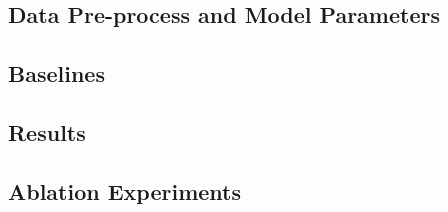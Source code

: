 \begin{Abstract}
\subsection{Data Pre-process and Model Parameters}

\subsection{Baselines}

\subsection{Results}

\subsection{Ablation Experiments}


\end{Abstract}
